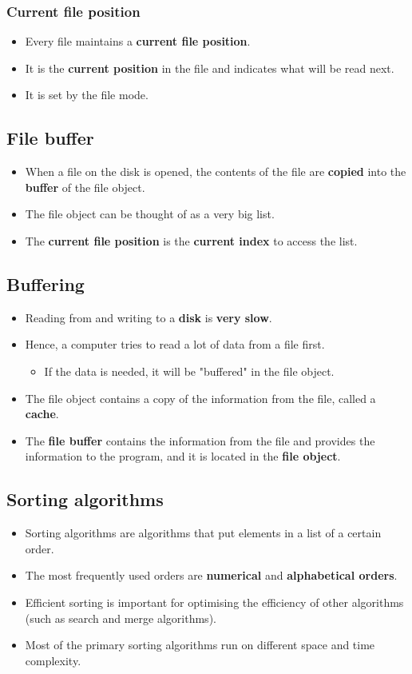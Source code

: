 \documentclass[11pt]{article}
\begin{document}
\subsubsection{Current file position}
\label{sec:org059aca4}
\begin{itemize}
\item Every file maintains a \textbf{current file position}.
\item It is the \textbf{current position} in the file and indicates what will be read next.
\item It is set by the file mode.
\end{itemize}
\subsection{File buffer}
\label{sec:org7a9aaa6}
\begin{itemize}
\item When a file on the disk is opened, the contents of the file are \textbf{copied} into the \textbf{buffer} of the file object.
\item The file object can be thought of as a very big list.
\item The \textbf{current file position} is the \textbf{current index} to access the list.
\end{itemize}
\subsection{Buffering}
\label{sec:orgedd6ba4}
\begin{itemize}
\item Reading from and writing to a \textbf{disk} is \textbf{very slow}.
\item Hence, a computer tries to read a lot of data from a file first.
\begin{itemize}
\item If the data is needed, it will be "buffered" in the file object.
\end{itemize}
\item The file object contains a copy of the information from the file, called a \textbf{cache}.
\item The \textbf{file buffer} contains the information from the file and provides the information to the program, and it is located in the \textbf{file object}.
\end{itemize}
\subsection{Sorting algorithms}
\label{sec:org2d0585d}
\begin{itemize}
\item Sorting algorithms are algorithms that put elements in a list of a certain order.
\item The most frequently used orders are \textbf{numerical} and \textbf{alphabetical orders}.
\item Efficient sorting is important for optimising the efficiency of other algorithms (such as search and merge algorithms).
\item Most of the primary sorting algorithms run on different space and time complexity.
\end{itemize}
\end{document}

